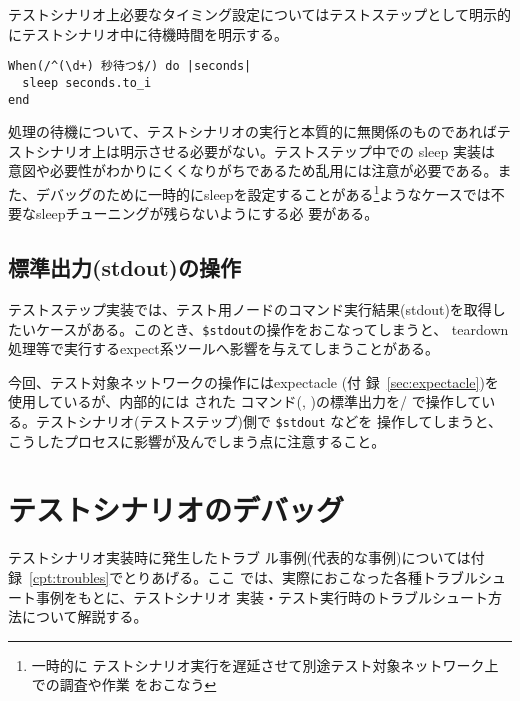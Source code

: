 テストシナリオ上必要なタイミング設定についてはテストステップとして明示的
にテストシナリオ中に待機時間を明示する。
\begin{lstlisting}
When(/^(\d+) 秒待つ$/) do |seconds|
  sleep seconds.to_i
end
\end{lstlisting}

処理の待機について、テストシナリオの実行と本質的に無関係のものであればテ
ストシナリオ上は明示させる必要がない。テストステップ中での sleep 実装は
意図や必要性がわかりにくくなりがちであるため乱用には注意が必要である。ま
た、デバッグのために一時的にsleepを設定することがある\footnote{一時的に
テストシナリオ実行を遅延させて別途テスト対象ネットワーク上での調査や作業
をおこなう}ようなケースでは不要なsleepチューニングが残らないようにする必
要がある。

  \subsection{標準出力(stdout)の操作}
テストステップ実装では、テスト用ノードのコマンド実行結果(stdout)を取得し
たいケースがある。このとき、\verb|$stdout|の操作をおこなってしまうと、
teardown処理等で実行するexpect系ツールへ影響を与えてしまうことがある。

今回、テスト対象ネットワークの操作にはexpectacle (付
録~\ref{sec:expectacle})を使用しているが、内部的には  された
コマンド(, )の標準出力を/
で操作している。テストシナリオ(テストステップ)側で \verb|$stdout| などを
操作してしまうと、こうしたプロセスに影響が及んでしまう点に注意すること。

 \section{テストシナリオのデバッグ}
 \label{sec:debugging-test-scenario}テストシナリオ実装時に発生したトラブ
 ル事例(代表的な事例)については付録~\ref{cpt:troubles}でとりあげる。ここ
 では、実際におこなった各種トラブルシュート事例をもとに、テストシナリオ
 実装・テスト実行時のトラブルシュート方法について解説する。

